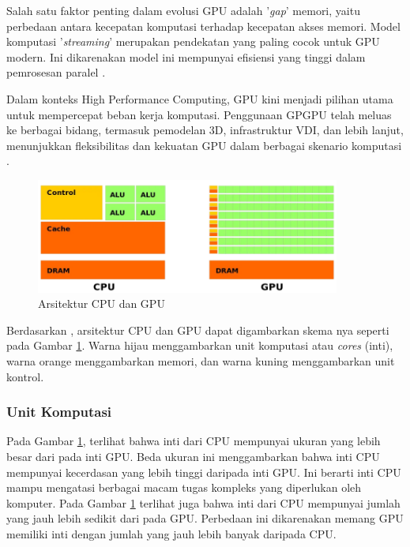 
Salah satu faktor penting dalam evolusi GPU adalah '\emph{gap}' memori, yaitu perbedaan
antara kecepatan komputasi terhadap kecepatan akses memori. Model komputasi '\emph{streaming}'
merupakan pendekatan yang paling cocok untuk GPU modern. Ini dikarenakan model
ini mempunyai efisiensi yang tinggi dalam pemrosesan paralel \citep{pharrGPUGemsProgramming2005}.


Dalam konteks High Performance Computing, GPU kini menjadi pilihan utama untuk mempercepat
beban kerja komputasi. Penggunaan GPGPU telah meluas ke berbagai bidang, termasuk
pemodelan 3D, infrastruktur VDI, dan lebih lanjut, menunjukkan fleksibilitas dan
kekuatan GPU dalam berbagai skenario komputasi \citep{hagoortExploringGPUArchitecture2023}.

\begin{figure}[H]
  \centering
  \includegraphics[width=10cm]{images/cpu-gpu-architecture.png}
  \caption{Arsitektur CPU dan GPU}
  \label{gambar gpu-cpu architecture}
\end{figure}

Berdasarkan \cite{learningUnderstandingArchitectureGPU2023}, arsitektur CPU dan GPU
dapat digambarkan skema nya seperti pada Gambar \ref{gambar gpu-cpu architecture}.
Warna hijau menggambarkan unit komputasi atau \emph{cores} (inti), warna orange
menggambarkan memori, dan warna kuning menggambarkan unit kontrol.

\subsubsection{Unit Komputasi}
\label{unit komputasi}

Pada Gambar \ref{gambar gpu-cpu architecture}, terlihat bahwa inti dari CPU mempunyai
ukuran yang lebih besar dari pada inti GPU. Beda ukuran ini menggambarkan bahwa
inti CPU mempunyai kecerdasan yang lebih tinggi daripada inti GPU. Ini berarti inti
CPU mampu mengatasi berbagai macam tugas kompleks yang diperlukan oleh komputer.
Pada Gambar \ref{gambar gpu-cpu architecture} terlihat juga bahwa inti dari CPU
mempunyai jumlah yang jauh lebih sedikit dari pada GPU. Perbedaan ini dikarenakan
memang GPU memiliki inti dengan jumlah yang jauh lebih banyak daripada CPU.

